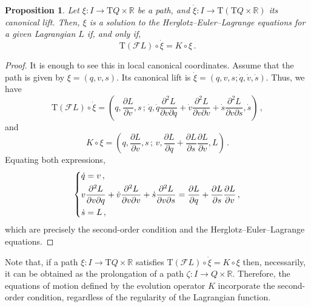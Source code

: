 \documentclass[11pt]{article}
\theoremstyle{plain}
\newtheorem{proposition}[theorem]{Proposition}
\theoremstyle{definition}
\newcommand{\R}{\mathbb{R}}
\newcommand{\T}{{\mathrm T}}
\let\Tan\T
\newcommand{\parder}[2]{\frac{\partial #1}{\partial #2}}
\newcommand{\parderr}[3]{\frac{\partial^2 #1}{\partial #2\partial #3}}
\def\Tan{\mathrm{T}}
\def\FL{\mathcal{F} L}
\begin{document}
\begin{proposition}
    Let $\xi \colon I\to\Tan Q \times \R$ be a path, and $\dot\xi \colon I \to \Tan(\Tan Q\times \R)$ its canonical lift. Then, $\xi$ is a solution to the Herglotz--Euler--Lagrange equations for a given Lagrangian $L$ if, and only if,
    \begin{equation} \label{contact_K_XL_relation}
        \Tan(\FL) \circ \dot\xi = K\circ \xi\,.
    \end{equation}
\end{proposition}
\begin{proof}
    It is enough to see this in local canonical coordinates. Assume that the path is given by $\xi = (q,v,s)$. 
    Its canonical lift is
    $\dot\xi = (q,v,s ; \dot q, \dot v, \dot s)$.
    Thus, we have
    \begin{equation}
        \Tan(\FL) \circ \dot \xi = \left( q, \parder{L}{v} , s\,;\, \dot q, \dot q \parderr{L}{v}{q} + \dot v \parderr{L}{v}{v} + \dot s\parderr{L}{v}{s}, \dot s \right) \,,
    \end{equation}
    and
    \begin{equation}
        K\circ \xi = \left( q,\parder{L}{v},s\,;\, v, \parder{L}{q} + \parder{L}{s} \parder{L}{v}, L  \right) \,.
    \end{equation}
    Equating both expressions,
    \begin{equation}
        \begin{dcases}
            \dot q = v \,,
            \\
            v \parderr{L}{v}{q} + \dot v \parderr{L}{v}{v} + \dot s\parderr{L}{v}{s} = \parder{L}{q} + \parder{L}{s} \parder{L}{v} \,,
            \\
            \dot s = L \,,
        \end{dcases}
    \end{equation}
    which are precisely the second-order condition and the Herglotz--Euler--Lagrange equations.
\end{proof}
Note that, if a path $\xi \colon I\to \Tan Q\times \R$ satisfies
$\Tan(\FL) \circ \dot \xi = K\circ \xi$
then, necessarily, it can be obtained as the prolongation of a path $\zeta \colon I \to Q\times \R$. Therefore, the equations of motion defined by the evolution operator $K$ incorporate the second-order condition, regardless of the regularity of the Lagrangian function.
\end{document}
